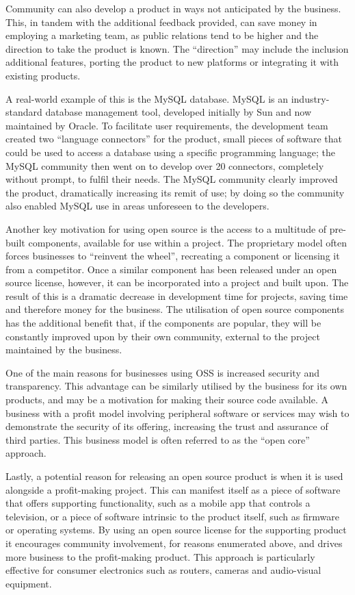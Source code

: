 \documentclass[a4paper]{article}
\begin{document}
Community can also develop a product in ways not anticipated by the business. This, in tandem with the additional feedback provided, can save money in employing a marketing team, as public relations tend to be higher\cite{wordopenoffice} and the direction to take the product is known. The “direction” may include the inclusion additional features, porting the product to new platforms or integrating it with existing products.

A real-world example of this is the MySQL database\cite{mysql}. MySQL is an industry-standard database management tool, developed initially by Sun and now maintained by Oracle. To facilitate user requirements, the development team created two “language connectors” for the product, small pieces of software that could be used to access a database using a specific programming language; the MySQL community then went on to develop over 20 connectors, completely without prompt, to fulfil their needs\cite{monty}. The MySQL community clearly improved the product, dramatically increasing its remit of use; by doing so the community also enabled MySQL use in areas unforeseen to the developers.

Another key motivation for using open source is the access to a multitude of pre-built components, available for use within a project. The proprietary model often forces businesses to “reinvent the wheel”, recreating a component or licensing it from a competitor. Once a similar component has been released under an open source license, however,  it can be incorporated into a project and built upon. The result of this is a dramatic decrease in development time for projects, saving time and therefore money for the business. The utilisation of open source components has the additional benefit that, if the components are popular, they will be constantly improved upon by their own community, external to the project maintained by the business.

One of the main reasons for businesses using OSS is increased security and transparency. This advantage can be similarly utilised by the business for its own products, and may be a motivation for making their source code available. A business with a profit model involving peripheral software or services may wish to demonstrate the security of its offering, increasing the trust and assurance of third parties. This business model is often referred to as the “open core” approach\cite{monty}.

Lastly, a potential reason for releasing an open source product is when it is used alongside a profit-making project. This can manifest itself as a piece of software that offers supporting functionality, such as a mobile app that controls a television, or a piece of software intrinsic to the product itself, such as firmware or operating systems. By using an open source license for the supporting product it encourages community involvement\cite{magiclantern}, for reasons enumerated above, and drives more business to the profit-making product. This approach is particularly effective for consumer electronics such as routers, cameras and audio-visual equipment.
\end{document}
